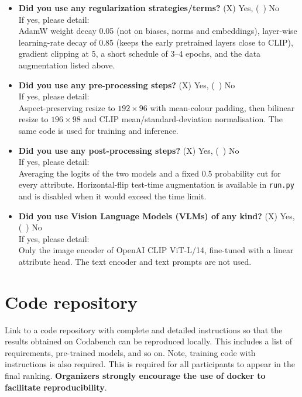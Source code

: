\documentclass[a4paper, 10pt, conference]{ieeeconf}
\begin{document}
\begin{itemize}
\item \textbf{Did you use any regularization strategies/terms?} (X) Yes, (~) No\\
If yes, please detail:\\
AdamW weight decay 0.05 (not on biases, norms and embeddings), layer-wise learning-rate decay of 0.85 (keeps the early pretrained layers close to CLIP), gradient clipping at 5, a short schedule of 3--4 epochs, and the data augmentation listed above.


\item \textbf{Did you use any pre-processing steps?} (X) Yes, (~) No\\
If yes, please detail:\\
Aspect-preserving resize to $192\times96$ with mean-colour padding, then bilinear resize to $196\times98$ and CLIP mean/standard-deviation normalisation. The same code is used for training and inference.


\item \textbf{Did you use any post-processing steps?} (X) Yes, (~) No\\
If yes, please detail:\\
Averaging the logits of the two models and a fixed 0.5 probability cut for every attribute. Horizontal-flip test-time augmentation is available in \texttt{run.py} and is disabled when it would exceed the time limit.


\item \textbf{Did you use Vision Language Models (VLMs) of any kind?} (X) Yes, (~) No\\
If yes, please detail:\\
Only the image encoder of OpenAI CLIP ViT-L/14, fine-tuned with a linear attribute head. The text encoder and text prompts are not used.
\end{itemize}



\section{Code repository}
Link to a code repository with complete and detailed instructions so that the results obtained on Codabench can be reproduced locally. This includes a list of requirements, pre-trained models, and so on. Note, training code with instructions is also required. This is required for all participants to appear in the final ranking. \textbf{Organizers strongly encourage the use of docker to facilitate reproducibility}. \\
\end{document}

